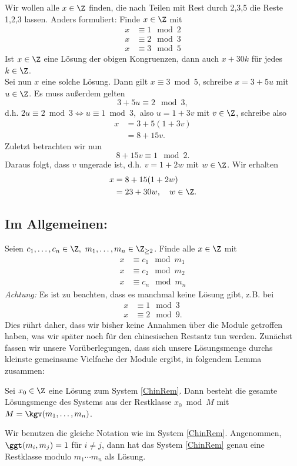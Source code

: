 Wir wollen alle $x \in \Z$ finden, die nach Teilen mit Rest durch 2,3,5 die Reste 1,2,3 lassen. Anders formuliert: Finde $x \in \Z$ mit
\begin{align*}
	x &\equiv 1 \mod 2\\
	x &\equiv 2 \mod 3\\
	x &\equiv 3 \mod 5
\end{align*}
Ist $x \in \Z$ eine Lösung der obigen Kongruenzen, dann auch $x + 30k$ für jedes $k \in \Z$.\\
Sei nun $x$ eine solche Lösung. Dann gilt $x \equiv 3 \bmod 5$, schreibe $x = 3+5u$ mit $u \in \Z$. Es muss außerdem gelten
\[ 3 + 5u \equiv 2 \mod 3, \]
d.h. $2u \equiv 2 \bmod 3 \iff u \equiv 1 \bmod 3,$ also $u = 1+3v$ mit $v \in \Z$, schreibe also
\begin{align*}
	x &= 3+5(1+3v)\\
	&= 8+15v.
\end{align*}
Zuletzt betrachten wir nun 
\[ 8+15v \equiv 1 \mod 2. \]
Daraus folgt, dass $v$ ungerade ist, d.h. $v = 1+2w$ mit $w \in \Z$. Wir erhalten
\begin{align*}
	x &= 8+15(1+2w)\\
	&= 23+30w,\quad w \in \Z.
\end{align*}

\subsection*{Im Allgemeinen:}

Seien $c_1,\dotsc,c_n \in \Z,\ m_1,\dotsc,m_n \in \Z_{\geq 2}$. Finde alle $x \in \Z$ mit
\begin{equation}\label{ChinRem}
	\begin{split}
		x &\equiv c_1 \mod m_1\\
		x &\equiv c_2 \mod m_2\\
		x &\equiv c_n \mod m_n
	\end{split}\tag{$*$}
\end{equation}
\emph{Achtung:} Es ist zu beachten, dass es manchmal keine Lösung gibt, z.B. bei 
\begin{align*}
	x &\equiv 1 \mod 3\\
	x &\equiv 2 \mod 9.
\end{align*}
Dies rührt daher, dass wir bisher keine Annahmen über die Module getroffen haben, was wir später noch für den chinesischen Restsatz tun werden. Zunächst fassen wir unsere Vorüberlegungen, dass sich unsere Lösungsmenge durchs kleinste gemeinsame Vielfache der Module ergibt, in folgendem Lemma zusammen:

\begin{lem}\autolabel
	Sei $x_0 \in \Z$ eine Lösung zum System \ref{ChinRem}. Dann besteht die gesamte Lösungsmenge des Systems aus der Restklasse $x_0 \bmod M$ mit $M = \kgv(m_1,\dotsc,m_n)$.
\end{lem}

\begin{thm}\autolabel\video
	Wir benutzen die gleiche Notation wie im System \ref{ChinRem}. Angenommen, $\ggt(m_i,m_j)=1$ für $i \neq j$, dann hat das System \ref{ChinRem} genau eine Restklasse modulo $m_1 \dotsm m_n$ als Lösung.
\end{thm}